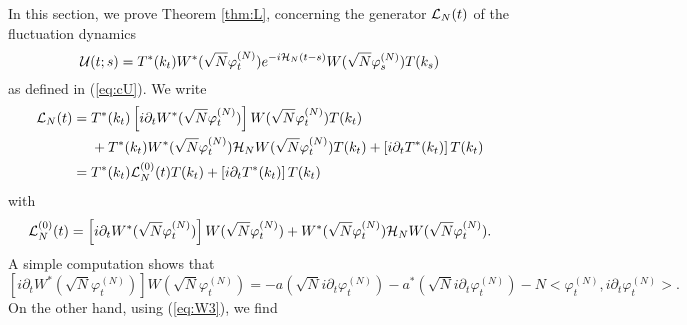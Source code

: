 \documentclass[11pt,a4paper]{article}
\newcommand{\done}{}
\newcommand{\cU}{{\cal U}}
\newcommand{\cH}{{\cal H}}
\newcommand{\cL}{{\cal L}}
\newcommand{\scal}[2]{\big<#1,#2\big>} %
\renewcommand{\Im}{\operatorname{Im}\,} 	%
\newcommand{\ph}{\varphi_t^{(N)}}	%
\begin{document}
In this section, we prove Theorem \ref{thm:L},  concerning the generator $\cL_N (t)$ of the fluctuation dynamics
\[  \cU (t;s) = T^* (k_t) W^* (\sqrt{N} \varphi_t^{(N)}) e^{-i\cH_N (t-s)} W(\sqrt{N} \varphi_s^{(N)}) T(k_s) \]
as defined in (\ref{eq:cU}). We write
\begin{equation}\label{eq:cLN} \begin{split}  \cL_N (t) = \; &T^* (k_t) \left[ i \partial_t W^* (\sqrt{N} \varphi_t^{(N)}) \right] W(\sqrt{N} \varphi_t^{(N)}) T (k_t) \\ &+ T^* (k_t) W^* (\sqrt{N} \varphi_t^{(N)}) \cH_N W (\sqrt{N} \varphi_t^{(N)}) T (k_t) + \left[ i \partial_t T^* (k_t) \right] T(k_t) \\
= \; &T^* (k_t) \cL^{(0)}_N (t) T (k_t) + \left[ i \partial_t T^* (k_t) \right] T(k_t) \end{split} \end{equation}
with 
\[ \cL_N^{(0)} (t) =  \left[ i \partial_t W^* (\sqrt{N} \varphi_t^{(N)}) \right] W(\sqrt{N} \varphi_t^{(N)}) + 
W^* (\sqrt{N} \varphi_t^{(N)}) \cH_N W (\sqrt{N} \varphi_t^{(N)}). \]
A simple computation shows that
\begin{displaymath}
 \left[ i \partial_t W^* (\sqrt{N} \varphi_t^{(N)}) \right] W(\sqrt{N}
 \varphi_t^{(N)})%
= - a(\sqrt{N} i \partial_t \varphi_t^{(N)}) - a^*
 (\sqrt{N} i \partial_t \varphi_t^{(N)}) - N \scal{\ph}{i\partial_t \ph}.\done
\end{displaymath}
 On the other hand, using (\ref{eq:W3}), we find
\end{document}

